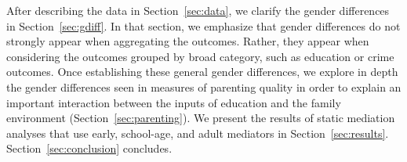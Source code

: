 After describing the data in Section~\ref{sec:data}, we clarify the gender differences in Section~\ref{sec:gdiff}. In that section, we emphasize that gender differences do not strongly appear when aggregating the outcomes. Rather, they appear when considering the outcomes grouped by broad category, such as education or crime outcomes. 
Once establishing these general gender differences, we explore in depth the gender differences seen in measures of parenting quality in order to explain an important interaction between the inputs of education and the family environment (Section~\ref{sec:parenting}).
We present the results of static mediation analyses that use early, school-age, and adult mediators in Section~\ref{sec:results}. Section~\ref{sec:conclusion} concludes.